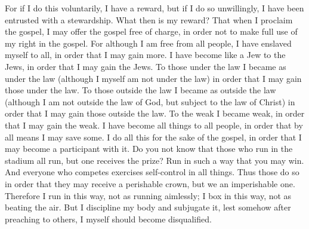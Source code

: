 \begin{biblechapter}
\verse For if I do this voluntarily, I have a reward, but if I do so unwillingly, I have been entrusted with a stewardship.
\verse What then is my reward? That when I proclaim the gospel, I may offer the gospel free of charge, in order not to make full use of my right in the gospel.
\verse For although I am free from all people, I have enslaved myself to all, in order that I may gain more.
\verse I have become like a Jew to the Jews, in order that I may gain the Jews. To those under the law I became as under the law (although I myself am not under the law) in order that I may gain those under the law.
\verse To those outside the law I became as outside the law (although I am not outside the law of God, but subject to the law of Christ) in order that I may gain those outside the law.
\verse To the weak I became weak, in order that I may gain the weak. I have become all things to all people, in order that by all means I may save some.
\verse I do all this for the sake of the gospel, in order that I may become a participant with it.
\verse Do you not know that those who run in the stadium all run, but one receives the prize? Run in such a way that you may win.
\verse And everyone who competes exercises self-control in all things. Thus those do so in order that they may receive a perishable crown, but we an imperishable one.
\verse Therefore I run in this way, not as running aimlessly; I box in this way, not as beating the air.
\verse But I discipline my body and subjugate it, lest somehow after preaching to others, I myself should become disqualified.
\end{biblechapter}

